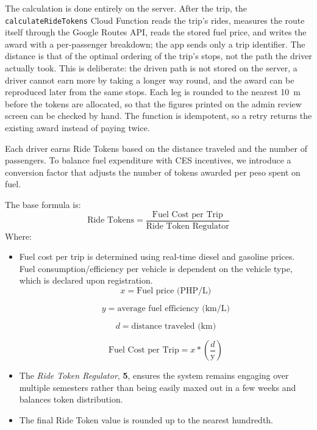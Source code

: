 The calculation is done entirely on the server. After the trip, the \texttt{calculateRideTokens} Cloud Function reads the trip's rides, measures the route itself through the Google Routes API, reads the stored fuel price, and writes the award with a per-passenger breakdown; the app sends only a trip identifier. The distance is that of the optimal ordering of the trip's stops, not the path the driver actually took. This is deliberate: the driven path is not stored on the server, a driver cannot earn more by taking a longer way round, and the award can be reproduced later from the same stops. Each leg is rounded to the nearest 10~m before the tokens are allocated, so that the figures printed on the admin review screen can be checked by hand. The function is idempotent, so a retry returns the existing award instead of paying twice.

Each driver earns Ride Tokens based on the distance traveled and the number of passengers. To balance fuel expenditure with CES incentives, we introduce a conversion factor that adjusts the number of tokens awarded per peso spent on fuel.

The base formula is:
\begin{equation}
    \text{Ride Tokens} = \frac{\text{Fuel Cost per Trip}}{\text{Ride Token Regulator}}
\end{equation}
Where: 
\begin{itemize}
    \item Fuel cost per trip is determined using real-time diesel and gasoline prices. Fuel consumption/efficiency per vehicle is dependent on the vehicle type, which is declared upon registration.
        \begin{equation}
            x = \text{Fuel price (PHP/L)}
        \end{equation}
    
        \begin{equation}
            y = \text{average fuel efficiency (km/L)}
        \end{equation}
        
        \begin{equation}
            d = \text{distance traveled (km)}
        \end{equation}
        
        \begin{equation}
            \text{Fuel Cost per Trip} = x * (\frac{d}{\text{y}})
        \end{equation}

    \item The \textit{Ride Token Regulator}, \textbf{5}, ensures the system remains engaging over multiple semesters rather than being easily maxed out in a few weeks and balances token distribution.

    \item The final Ride Token value is rounded up to the nearest hundredth.

\end{itemize}

